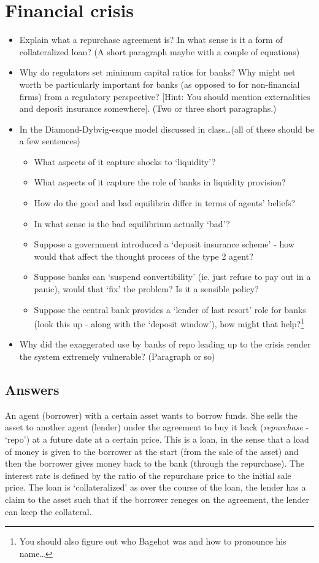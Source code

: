 \documentclass[authoryear,11pt]{elsarticle}
\begin{document}
\section{Financial crisis}
\begin{itemize}
\item	Explain what a repurchase agreement is? In what sense is it a form of collateralized loan? (A short paragraph maybe with a couple of equations)
\item	Why do regulators set minimum capital ratios for banks? Why might net worth be particularly important for banks (as opposed to for non-financial firms) from a regulatory perspective? [Hint: You should mention externalities and deposit insurance somewhere]. (Two or three short paragraphs.)
\item	In the Diamond-Dybvig-esque model discussed in class\ldots (all of these should be a few sentences)
	\begin{itemize}
	\item	What aspects of it capture shocks to `liquidity'?
	\item	What aspects of it capture the role of banks in liquidity provision?
	\item	How do the good and bad equilibria differ in terms of agents' beliefs?
	\item	In what sense is the bad equilibrium actually `bad'?
	\item	Suppose a government introduced a `deposit insurance scheme' - how would that affect the thought process of the type 2 agent?
	\item	Suppose banks can `suspend convertibility' (ie. just refuse to pay out in a panic), would that `fix' the problem? Is it a sensible policy?
	\item	Suppose the central bank provides a `lender of last resort' role for banks (look this up - along with the `deposit window'), how might that help?\footnote{You should also figure out who Bagehot was and how to pronounce his name\ldots}
	\end{itemize}
\item	Why did the exaggerated use by banks of repo leading up to the crisis render the system extremely vulnerable? (Paragraph or so)
\end{itemize}

\subsection*{Answers}
An agent (borrower) with a certain asset wants to borrow funds. She sells the asset to another agent (lender) under the agreement to buy it back (\textit{repurchase} - `repo') at a future date at a certain price. This is a loan, in the sense that a load of money is given to the borrower at the start (from the sale of the asset) and then the borrower gives money back to the bank (through the repurchase). The interest rate is defined by the ratio of the repurchase price to the initial sale price. The loan is `collateralized' as over the course of the loan, the lender has a claim to the asset such that if the borrower reneges on the agreement, the lender can keep the collateral.
\end{document}
